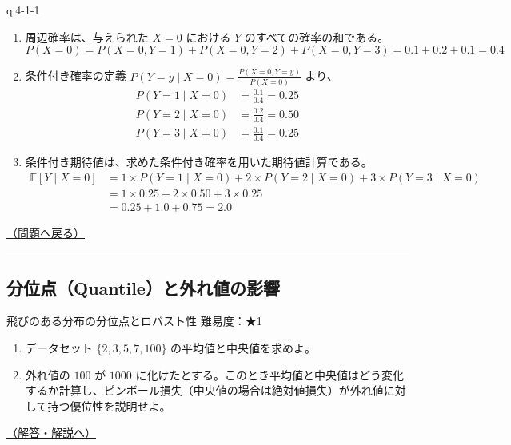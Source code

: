\begin{answerbox}[phantomlabel=a:4-1-1]{q:4-1-1}

\begin{enumerate}
\def\labelenumi{\arabic{enumi}.}
\tightlist
\item
  周辺確率は、与えられた \(X=0\) における \(Y\)
  のすべての確率の和である。 \[
       P(X=0) = P(X=0, Y=1) + P(X=0, Y=2) + P(X=0, Y=3) = 0.1 + 0.2 + 0.1 = 0.4
       \]
\item
  条件付き確率の定義 \(P(Y=y \mid X=0) = \frac{P(X=0, Y=y)}{P(X=0)}\)
  より、 \begin{align*}
       P(Y=1 \mid X=0) &= \frac{0.1}{0.4} = 0.25 \\
       P(Y=2 \mid X=0) &= \frac{0.2}{0.4} = 0.50 \\
       P(Y=3 \mid X=0) &= \frac{0.1}{0.4} = 0.25
       \end{align*}
\item
  条件付き期待値は、求めた条件付き確率を用いた期待値計算である。
  \begin{align*}
       \mathbb{E}[Y \mid X=0] &= 1 \times P(Y=1 \mid X=0) + 2 \times P(Y=2 \mid X=0) + 3 \times P(Y=3 \mid X=0) \\
       &= 1 \times 0.25 + 2 \times 0.50 + 3 \times 0.25 \\
       &= 0.25 + 1.0 + 0.75 = 2.0
       \end{align*}
\end{enumerate}

\hfill 

\hyperref[q:4-1-1]{（問題へ戻る）}

\begin{center}\rule{0.5\linewidth}{0.5pt}\end{center}

\end{answerbox}

\subsection{分位点（Quantile）と外れ値の影響}\label{ux5206ux4f4dux70b9quantileux3068ux5916ux308cux5024ux306eux5f71ux97ff}

\begin{questionbox}[label=q:4-2-1]{飛びのある分布の分位点とロバスト性 \hfill \normalfont \small 難易度：★1}

\begin{enumerate}
\def\labelenumi{\arabic{enumi}.}
\tightlist
\item
  データセット \(\{2, 3, 5, 7, 100\}\) の平均値と中央値を求めよ。
\item
  外れ値の \(100\) が \(1000\)
  に化けたとする。このとき平均値と中央値はどう変化するか計算し、ピンボール損失（中央値の場合は絶対値損失）が外れ値に対して持つ優位性を説明せよ。
\end{enumerate}

\hfill 

\hyperref[a:4-2-1]{（解答・解説へ）}

\end{questionbox}

